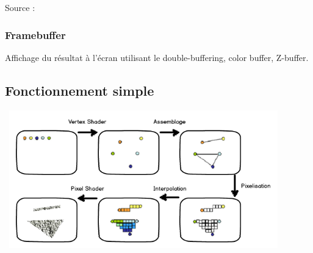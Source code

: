 Source : \cite{pipeline4}

\subsubsection{Framebuffer}
Affichage du résultat à l’écran utilisant le double-buffering, color buffer, Z-buffer.

\subsection{Fonctionnement simple}
\begin{center}
\includegraphics[width=12cm,height=60mm]{pipeline/images/pipelineSimple.png}
\end{center}